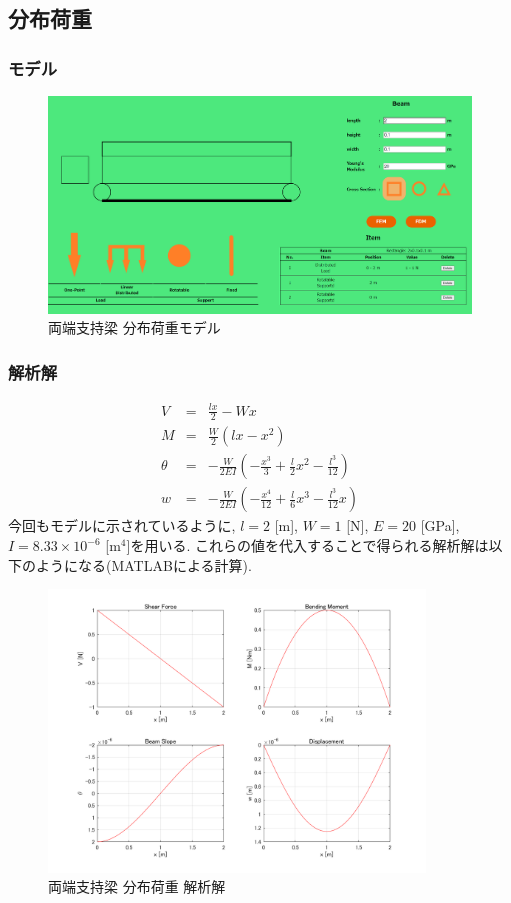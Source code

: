 \documentclass{jsarticle}
\begin{document}
\newpage
\subsection{分布荷重}
\subsubsection{モデル}
\begin{figure}[H]
\begin{center}
\includegraphics[width=13cm]{simple_distributed_model.PNG}
\caption{両端支持梁 分布荷重モデル}
\end{center}
\end{figure}

\subsubsection{解析解}

\begin{eqnarray*}
V &=& \frac{lx}{2}-Wx \\
M &=& \frac{W}{2}(lx-x^2) \\
\theta &=& -\frac{W}{2EI}\left(-\frac{x^3}{3}+\frac{l}{2}x^2-\frac{l^3}{12}\right) \\
w &=& -\frac{W}{2EI}\left(-\frac{x^4}{12}+\frac{l}{6}x^3-\frac{l^3}{12}x\right)
\end{eqnarray*}
今回もモデルに示されているように, $l=2$ [m], $W=1$ [N], $E=20$ [GPa], $I=8.33\times10^{-6}$ [m$^4$]を用いる. これらの値を代入することで得られる解析解は以下のようになる(MATLABによる計算).

\begin{figure}[H]
\begin{center}
\includegraphics[width=10cm]{Simple_Supported_Distributed_Beam.png}
\caption{両端支持梁 分布荷重 解析解}
\end{center}
\end{figure}
\end{document}
